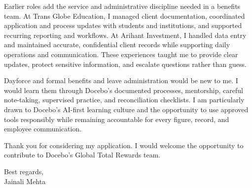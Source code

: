 \documentclass[letterpaper,11pt]{article}
\begin{document}
\bigbreak
Earlier roles add the service and administrative discipline needed in a benefits team. At Trans Globe Education, I managed client documentation, coordinated application and process updates with students and institutions, and supported recurring reporting and workflows. At Arihant Investment, I handled data entry and maintained accurate, confidential client records while supporting daily operations and communication. These experiences taught me to provide clear updates, protect sensitive information, and escalate questions rather than guess.

\bigbreak
Dayforce and formal benefits and leave administration would be new to me. I would learn them through Docebo's documented processes, mentorship, careful note-taking, supervised practice, and reconciliation checklists. I am particularly drawn to Docebo's AI-first learning culture and the opportunity to use approved tools responsibly while remaining accountable for every figure, record, and employee communication.

\bigbreak
Thank you for considering my application. I would welcome the opportunity to contribute to Docebo's Global Total Rewards team.

\bigbreak
Best regards,\\
Jainali Mehta
\end{document}
